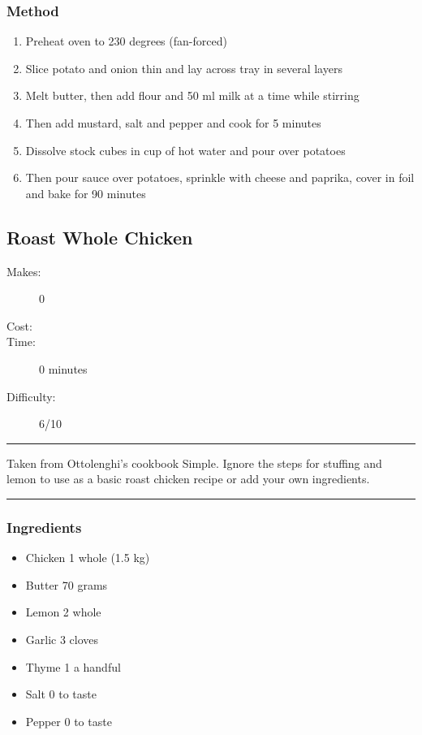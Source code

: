 \documentclass[]{article}
\begin{document}
\subsubsection*{\Large Method}
\begin{enumerate}[font=\huge\color{accent}]
	\item Preheat oven to 230 degrees (fan-forced)
	\item Slice potato and onion thin and lay across tray in several layers
	\item Melt butter, then add flour and 50 ml milk at a time while stirring
	\item Then add mustard, salt and pepper and cook for 5 minutes
	\item Dissolve stock cubes in cup of hot water and pour over potatoes
	\item Then pour sauce over potatoes, sprinkle with cheese and paprika, cover in foil and bake for 90 minutes
\end{enumerate}
\newpage
{}\label{rec:Roast Whole Chicken}
\subsection*{\center\huge Roast Whole Chicken}
\begin{description}
\item[Makes:] 0 
\item[Cost:] \textdollar
\item[Time:] 0 minutes
\item[Difficulty:] 6/10
\end{description}
\vspace{0.2cm}\hrule\vspace{0.5cm}
\begin{adjustwidth}{0.5 cm}{0.5 cm}

Taken from Ottolenghi's cookbook Simple. Ignore the steps for stuffing and lemon to use as a basic roast chicken recipe or add your own ingredients. 

\end{adjustwidth}
\vspace{0.5cm}\hrule
\subsubsection*{\Large Ingredients}
\begin{multicols}{2}
\begin{itemize}
 \item Chicken \hfill 1 whole (1.5 kg)
 \item Butter \hfill 70 grams
 \item Lemon \hfill 2 whole
 \item Garlic \hfill 3 cloves
 \item Thyme \hfill 1 a handful
 \item Salt \hfill 0 to taste
 \item Pepper \hfill 0 to taste
\end{itemize}
\end{multicols}
\end{document}
